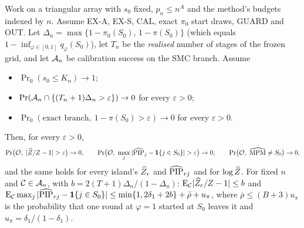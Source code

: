 \begin{theorem}\label{thm:evidence}
Work on a triangular array with $s_0$ fixed, $p_n\le n^A$ and the method's budgets indexed by $n$. Assume EX-A, EX-S,
CAL, exact $\pi_0$ start draws, GUARD and OUT. Let $\Delta_n=\max\{1-\pi_0(S_0),\,1-\pi(S_0)\}$ (which equals
$1-\inf_{\varphi\in[0,1]}q_\varphi(S_0)$), let $T_n$ be the \emph{realised} number of stages of the frozen grid, and
let $\mathcal A_n$ be calibration success on the SMC branch. Assume
\begin{itemize}
\item[($\Omega$)] $\Pr_0(s_0\le K_n)\to1$;
\item[(P1)] $\Pr(\mathcal A_n\cap\{(T_n+1)\Delta_n>\varepsilon\})\to0$ for every $\varepsilon>0$;
\item[(P1-ex)] $\Pr_0(\text{exact branch},\ 1-\pi(S_0)>\varepsilon)\to0$ for every $\varepsilon>0$.
\end{itemize}
Then, for every $\varepsilon>0$,
\[
\Pr\bigl(\cO,\ |\Zh/Z-1|>\varepsilon\bigr)\to0,\qquad
\Pr\bigl(\cO,\ \max_j|\widehat{\mathrm{PIP}}_j-\mathbf 1\{j\in S_0\}|>\varepsilon\bigr)\to0,\qquad
\Pr\bigl(\cO,\ \widehat{\mathrm{MPM}}\ne S_0\bigr)\to0,
\]
and the same holds for every island's $\widehat Z_r$ and $\widehat{\mathrm{PIP}}_{rj}$ and for $\log\widehat Z$. For fixed $n$ and $\mathcal C\in\mathcal A_n$, with
$b=2(T+1)\Delta_n/(1-\Delta_n)$: $\mathrm E_{\mathcal C}|\widehat Z_r/Z-1|\le b$ and
$\mathrm E_{\mathcal C}\max_j|\widehat{\mathrm{PIP}}_{rj}-\mathbf 1\{j\in S_0\}|\le\min\{1,2\delta_1+2b\}+\bar\rho+u_\pi$, where $\bar\rho\le(B+3)u_\pi$
is the probability that one round at $\varphi=1$ started at $S_0$ leaves it and $u_\pi=\delta_1/(1-\delta_1)$.
\end{theorem}

